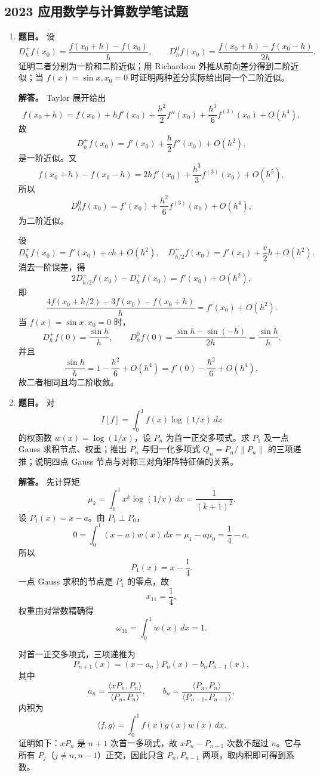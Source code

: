 ﻿\documentclass[UTF8,12pt]{ctexart}
\begin{document}
\subsection{2023 应用数学与计算数学笔试题}
\begin{enumerate}[label=\textbf{\arabic*.},leftmargin=2.2em]
\item \textbf{题目。} 设
\[
D_h^+f(x_0)=\frac{f(x_0+h)-f(x_0)}{h},\qquad
D_h^0f(x_0)=\frac{f(x_0+h)-f(x_0-h)}{2h}.
\]
证明二者分别为一阶和二阶近似；用 Richardson 外推从前向差分得到二阶近似；当 \(f(x)=\sin x,x_0=0\) 时证明两种差分实际给出同一个二阶近似。

\textbf{解答。} Taylor 展开给出
\[
f(x_0+h)=f(x_0)+hf'(x_0)+\frac{h^2}{2}f''(x_0)+\frac{h^3}{6}f^{(3)}(x_0)+O(h^4),
\]
故
\[
D_h^+f(x_0)=f'(x_0)+\frac h2 f''(x_0)+O(h^2),
\]
是一阶近似。又
\[
f(x_0+h)-f(x_0-h)=2hf'(x_0)+\frac{h^3}{3}f^{(3)}(x_0)+O(h^5),
\]
所以
\[
D_h^0f(x_0)=f'(x_0)+\frac{h^2}{6}f^{(3)}(x_0)+O(h^4),
\]
为二阶近似。

设
\[
D_h^+f(x_0)=f'(x_0)+ch+O(h^2),
\quad
D_{h/2}^+f(x_0)=f'(x_0)+\frac c2h+O(h^2).
\]
消去一阶误差，得
\[
2D_{h/2}^+f(x_0)-D_h^+f(x_0)=f'(x_0)+O(h^2),
\]
即
\[
\frac{4f(x_0+h/2)-3f(x_0)-f(x_0+h)}{h}=f'(x_0)+O(h^2).
\]
当 \(f(x)=\sin x,x_0=0\) 时，
\[
D_h^+f(0)=\frac{\sin h}{h},\qquad
D_h^0f(0)=\frac{\sin h-\sin(-h)}{2h}=\frac{\sin h}{h}.
\]
并且
\[
\frac{\sin h}{h}=1-\frac{h^2}{6}+O(h^4)=f'(0)-\frac{h^2}{6}+O(h^4),
\]
故二者相同且均二阶收敛。

\item \textbf{题目。} 对
\[
I[f]=\int_0^1 f(x)\log(1/x)\,dx
\]
的权函数 \(w(x)=\log(1/x)\)，设 \(P_n\) 为首一正交多项式。求 \(P_1\) 及一点 Gauss 求积节点、权重；推出 \(P_n\) 与归一化多项式 \(Q_n=P_n/\|P_n\|\) 的三项递推；说明四点 Gauss 节点与对称三对角矩阵特征值的关系。

\textbf{解答。} 先计算矩
\[
\mu_k=\int_0^1 x^k\log(1/x)\,dx=\frac1{(k+1)^2}.
\]
设 \(P_1(x)=x-a\)。由 \(P_1\perp P_0\)，
\[
0=\int_0^1(x-a)w(x)\,dx=\mu_1-a\mu_0=\frac14-a,
\]
所以
\[
P_1(x)=x-\frac14.
\]
一点 Gauss 求积的节点是 \(P_1\) 的零点，故
\[
x_{11}=\frac14,
\]
权重由对常数精确得
\[
\omega_{11}=\int_0^1w(x)\,dx=1.
\]

对首一正交多项式，三项递推为
\[
P_{n+1}(x)=(x-a_n)P_n(x)-b_nP_{n-1}(x),
\]
其中
\[
a_n=\frac{\langle xP_n,P_n\rangle}{\langle P_n,P_n\rangle},
\qquad
b_n=\frac{\langle P_n,P_n\rangle}{\langle P_{n-1},P_{n-1}\rangle},
\]
内积为
\[
\langle f,g\rangle=\int_0^1f(x)g(x)w(x)\,dx.
\]
证明如下：\(xP_n\) 是 \(n+1\) 次首一多项式，故 \(xP_n-P_{n+1}\) 次数不超过 \(n\)。它与所有 \(P_j\)（\(j\ne n,n-1\)）正交，因此只含 \(P_n,P_{n-1}\) 两项，取内积即可得到系数。


\end{enumerate}
\end{document}
